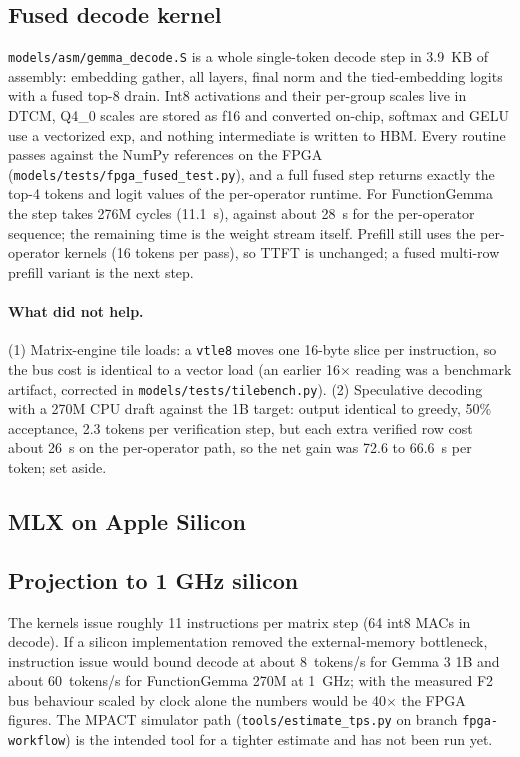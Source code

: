 \documentclass[11pt]{article}
\begin{document}
\subsection{Fused decode kernel}
\texttt{models/asm/gemma\_decode.S} is a whole single-token decode step in 3.9~KB of assembly:
embedding gather, all layers, final norm and the tied-embedding logits with a fused top-8 drain.
Int8 activations and their per-group scales live in DTCM, Q4\_0 scales are stored as f16 and
converted on-chip, softmax and GELU use a vectorized exp, and nothing intermediate is written
to HBM. Every routine passes against the NumPy references on the FPGA
(\texttt{models/tests/fpga\_fused\_test.py}), and a full fused step returns exactly the top-4
tokens and logit values of the per-operator runtime. For FunctionGemma the step takes 276M cycles
(11.1~s), against about 28~s for the per-operator sequence; the remaining time is the weight
stream itself. Prefill still uses the per-operator kernels (16 tokens per pass), so TTFT is
unchanged; a fused multi-row prefill variant is the next step.

\paragraph{What did not help.} (1) Matrix-engine tile loads: a \texttt{vtle8} moves one 16-byte
slice per instruction, so the bus cost is identical to a vector load (an earlier 16$\times$
reading was a benchmark artifact, corrected in \texttt{models/tests/tilebench.py}).
(2) Speculative decoding with a 270M CPU draft against the 1B target: output identical to greedy,
50\% acceptance, 2.3 tokens per verification step, but each extra verified row cost about 26~s
on the per-operator path, so the net gain was 72.6 to 66.6~s per token; set aside.

\subsection{MLX on Apple Silicon}
\begin{table}[H]\centering\footnotesize
\mlxtable
\caption{MLX reference runs on the Mac for the same prompt.}\label{tab:mlx}
\end{table}

\subsection{Projection to 1 GHz silicon}
The kernels issue roughly 11 instructions per matrix step (64 int8 MACs in decode). If a silicon
implementation removed the external-memory bottleneck, instruction issue would bound decode at
about 8~tokens/s for Gemma 3 1B and about 60~tokens/s for FunctionGemma 270M at 1~GHz; with the
measured F2 bus behaviour scaled by clock alone the numbers would be 40$\times$ the FPGA figures.
The MPACT simulator path (\texttt{tools/estimate\_tps.py} on branch \texttt{fpga-workflow}) is the
intended tool for a tighter estimate and has not been run yet.
\end{document}
